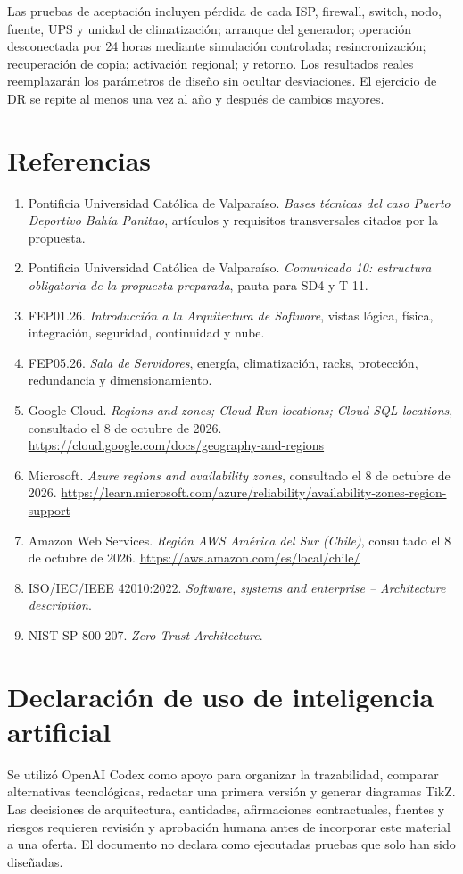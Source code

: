 \documentclass[11pt,letterpaper]{report}
\begin{document}
Las pruebas de aceptación incluyen pérdida de cada ISP, firewall, switch, nodo, fuente, UPS y unidad de climatización; arranque del generador; operación desconectada por 24 horas mediante simulación controlada; resincronización; recuperación de copia; activación regional; y retorno. Los resultados reales reemplazarán los parámetros de diseño sin ocultar desviaciones. El ejercicio de DR se repite al menos una vez al año y después de cambios mayores.

\section*{Referencias}

\begin{enumerate}
\item Pontificia Universidad Católica de Valparaíso. \textit{Bases técnicas del caso Puerto Deportivo Bahía Panitao}, artículos y requisitos transversales citados por la propuesta.
\item Pontificia Universidad Católica de Valparaíso. \textit{Comunicado 10: estructura obligatoria de la propuesta preparada}, pauta para SD4 y T-11.
\item FEP01.26. \textit{Introducción a la Arquitectura de Software}, vistas lógica, física, integración, seguridad, continuidad y nube.
\item FEP05.26. \textit{Sala de Servidores}, energía, climatización, racks, protección, redundancia y dimensionamiento.
\item Google Cloud. \textit{Regions and zones; Cloud Run locations; Cloud SQL locations}, consultado el 8 de octubre de 2026. \url{https://cloud.google.com/docs/geography-and-regions}
\item Microsoft. \textit{Azure regions and availability zones}, consultado el 8 de octubre de 2026. \url{https://learn.microsoft.com/azure/reliability/availability-zones-region-support}
\item Amazon Web Services. \textit{Región AWS América del Sur (Chile)}, consultado el 8 de octubre de 2026. \url{https://aws.amazon.com/es/local/chile/}
\item ISO/IEC/IEEE 42010:2022. \textit{Software, systems and enterprise -- Architecture description}.
\item NIST SP 800-207. \textit{Zero Trust Architecture}.
\end{enumerate}

\section*{Declaración de uso de inteligencia artificial}

Se utilizó OpenAI Codex como apoyo para organizar la trazabilidad, comparar alternativas tecnológicas, redactar una primera versión y generar diagramas TikZ. Las decisiones de arquitectura, cantidades, afirmaciones contractuales, fuentes y riesgos requieren revisión y aprobación humana antes de incorporar este material a una oferta. El documento no declara como ejecutadas pruebas que solo han sido diseñadas.
\end{document}
